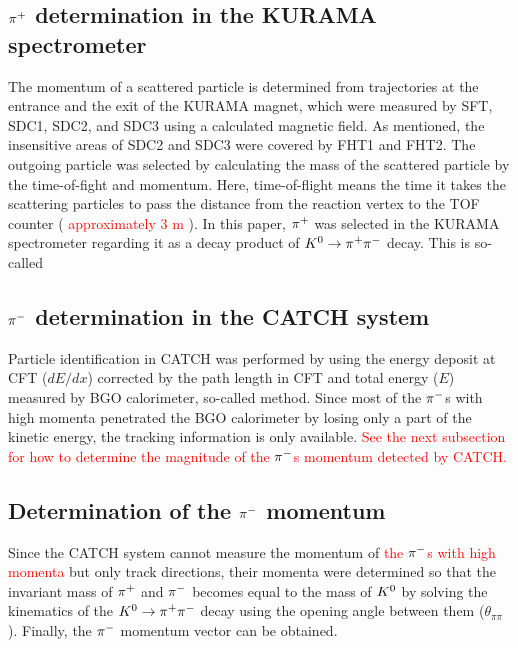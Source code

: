 \subsection{$\pi^{+}$ determination in the KURAMA spectrometer}
The momentum of a scattered particle is determined from trajectories at the entrance and the exit of the KURAMA magnet, which were measured by SFT, SDC1, SDC2, and SDC3 using a calculated magnetic field. As mentioned, the insensitive areas of SDC2 and SDC3 were covered by FHT1 and FHT2. The outgoing particle was selected by calculating the mass of the scattered particle by the time-of-fight and momentum. Here, time-of-flight means the time it takes the scattering particles to pass the distance from the reaction vertex to the TOF counter (\textcolor{red}{ approximately 3 m }). In this paper, $\pi^{+}$ was selected in the KURAMA spectrometer regarding it as a decay product of $K^0 \to \pi^+ \pi^-$ decay. This is so-called 
  
\subsection{$\pi^{-}$ determination in the CATCH system}
Particle identification in CATCH was performed by using the energy deposit at CFT ($dE/dx$) corrected by the path length in CFT and total energy ($E$) measured by BGO calorimeter, so-called  method. Since most of the $\pi^{-}$s with high momenta penetrated the BGO calorimeter by losing only a part of the kinetic energy, the tracking information is only available. \textcolor{red}{ See the next subsection for how to determine the magnitude of the $\pi^{-}$s momentum detected by CATCH. }

  
\subsection{Determination of the $\pi^{-}$ momentum}
Since the CATCH system cannot measure the momentum of \textcolor{red}{ the $\pi^{-}$s with high momenta } but only track directions, their momenta were determined so that the invariant mass of $\pi^{+}$ and $\pi^{-}$ becomes equal to the mass of $K^{0}$ by solving the kinematics of the $K^0 \to \pi^+ \pi^-$ decay using the opening angle between them ($\theta_{\pi\pi}$). Finally, the $\pi^{-}$ momentum vector can be obtained. 
  
